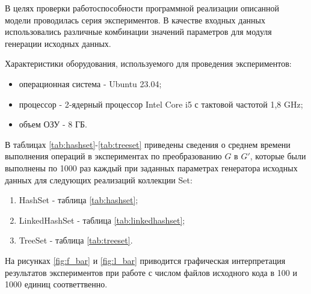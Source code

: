 

В целях проверки работоспособности программной реализации описанной модели проводилась серия экспериментов. В качестве входных данных использовались различные комбинации значений параметров для модуля генерации исходных данных.

Характеристики оборудования, используемого для проведения экспериментов:
\begin{itemize}
    \item операционная система - Ubuntu 23.04;
    \item процессор - 2‑ядерный процессор Intel Core i5 с тактовой частотой 1,8 GHz;
    \item объем ОЗУ - 8 ГБ.
\end{itemize}

В таблицах \ref{tab:hashset}-\ref{tab:treeset} приведены сведения о среднем времени выполнения операций в экспериментах по преобразованию $G$ в $G'$, которые были выполнены по 1000 раз каждый при заданных параметрах генератора исходных данных для следующих реализаций коллекции Set:
\begin{enumerate}
    \item HashSet - таблица \ref{tab:hashset};
    \item LinkedHashSet - таблица \ref{tab:linkedhashset};
    \item TreeSet - таблица \ref{tab:treeset}.
\end{enumerate}

На рисунках \ref{fig:f_bar} и \ref{fig:l_bar} приводится графическая интерпретация результатов экспериментов при работе с числом файлов исходного кода в 100 и 1000 единиц соответтвенно.

